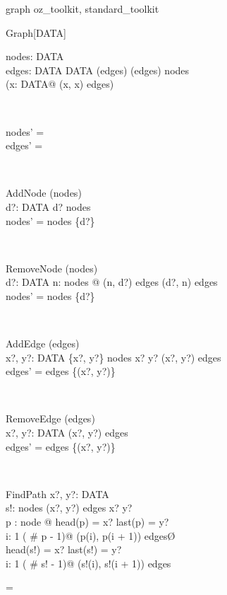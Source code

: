 \begin{zsection}
  \SECTION graph \parents oz\_toolkit, standard\_toolkit
\end{zsection}

\zedindent=2mm
\begin{class}{Graph}[DATA]
\also
\begin{state}
nodes:  \finset DATA \\ 
edges: DATA \rel DATA
\where
 \dom (edges) \cup  \ran (edges) \subseteq nodes \\ 
 \lnot (\exists x: DATA@ (x, x) \in edges)
\end{state}\\
\begin{init}
nodes' = \emptyset \\ 
edges' = \emptyset
\end{init} \\
\begin{schema}{AddNode}
\Delta(nodes)\\
d?: DATA 
\where
 d? \notin nodes \\ 
 nodes' = nodes \cup \{d?\} 
\end{schema} \\
\begin{schema}{RemoveNode}
\Delta (nodes)\\
d?: DATA 
\where
  \lnot \exists n: nodes @ (n, d?) \in edges \lor 
    (d?, n) \in edges\\ 
 nodes' = nodes \setminus \{d?\} 
\end{schema} \\
\begin{schema}{AddEdge}
\Delta (edges)\\
x?, y?: DATA 
\where
 \{x?, y?\} \subseteq nodes \land  x? \neq y? \land 
         (x?, y?) \notin edges \\ 
 edges' = edges \cup \{(x?, y?)\} 
\end{schema}\\
\begin{schema}{RemoveEdge}
\Delta (edges)\\
x?, y?: DATA 
\where
 (x?, y?) \in edges \\ 
 edges' = edges \setminus \{(x?, y?)\} \\ 
\end{schema} \\
\begin{schema}{FindPath}
x?, y?: DATA \\ 
s!:  \iseq nodes 
\where
 (x?, y?) \in edges \plus  \land x? \neq y? \land\\
       \exists p : \iseq node @ \M  head(p) = x? \land last(p) = y? \land\\
       \forall i: 1 \upto ( \# p - 1)@ (p(i), p(i + 1)) \in edges\O \\ 
 head(s!) = x? \land last(s!) = y?\\ 
\forall i: 1 \upto ( \# s! - 1)@ (s!(i), s!(i + 1)) \in edges 
\end{schema} 
\end{class} 
\zedindent=\leftmargini
